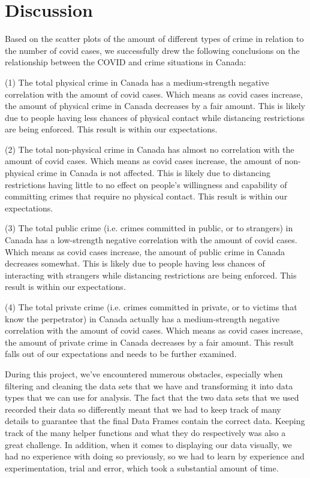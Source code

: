 \documentclass[fontsize=11pt]{article}
\begin{document}
\section{Discussion}
Based on the scatter plots of the amount of different types of crime in relation to the number of covid cases, we successfully drew the following conclusions on the relationship between the COVID and crime situations in Canada: 

(1) The total physical crime in Canada has a medium-strength negative correlation with the amount of covid cases. Which means as covid cases increase, the amount of physical crime in Canada decreases by a fair amount. This is likely due to people having less chances of physical contact while distancing restrictions are being enforced. This result is within our expectations.

(2) The total non-physical crime in Canada has almost no correlation with the amount of covid cases. Which means as covid cases increase, the amount of non-physical crime in Canada is not affected. This is likely due to distancing restrictions having little to no effect on people's willingness and capability of committing crimes that require no physical contact. This result is within our expectations.

(3) The total public crime (i.e. crimes committed in public, or to strangers) in Canada has a low-strength negative correlation with the amount of covid cases. Which means as covid cases increase, the amount of public crime in Canada decreases somewhat. This is likely due to people having less chances of interacting with strangers while distancing restrictions are being enforced. This result is within our expectations.

(4) The total private crime (i.e. crimes committed in private, or to victims that know the perpetrator) in Canada actually has a medium-strength negative correlation with the amount of covid cases. Which means as covid cases increase, the amount of private crime in Canada decreases by a fair amount. This result falls out of our expectations and needs to be further examined.

During this project, we've encountered numerous obstacles, especially when filtering and cleaning the data sets that we have and transforming it into data types that we can use for analysis. The fact that the two data sets that we used recorded their data so differently meant that we had to keep track of many details to guarantee that the final Data Frames contain the correct data. Keeping track of the many helper functions and what they do respectively was also a great challenge. In addition, when it comes to displaying our data visually, we had no experience with doing so previously, so we had to learn by experience and experimentation, trial and error, which took a substantial amount of time.
\end{document}
